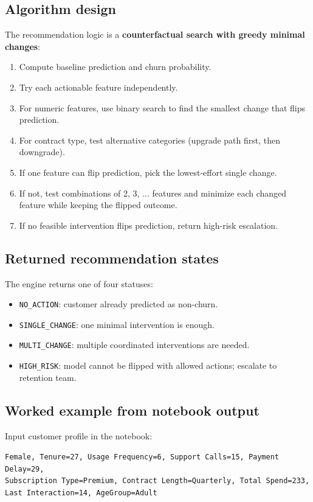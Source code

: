 \documentclass[11pt]{article}
\begin{document}
\subsection*{Algorithm design}
The recommendation logic is a \textbf{counterfactual search with greedy minimal changes}:
\begin{enumerate}
    \item Compute baseline prediction and churn probability.
    \item Try each actionable feature independently.
    \item For numeric features, use binary search to find the smallest change that flips prediction.
    \item For contract type, test alternative categories (upgrade path first, then downgrade).
    \item If one feature can flip prediction, pick the lowest-effort single change.
    \item If not, test combinations of 2, 3, ... features and minimize each changed feature while keeping the flipped outcome.
    \item If no feasible intervention flips prediction, return high-risk escalation.
\end{enumerate}

\subsection*{Returned recommendation states}
The engine returns one of four statuses:
\begin{itemize}
    \item \texttt{NO\_ACTION}: customer already predicted as non-churn.
    \item \texttt{SINGLE\_CHANGE}: one minimal intervention is enough.
    \item \texttt{MULTI\_CHANGE}: multiple coordinated interventions are needed.
    \item \texttt{HIGH\_RISK}: model cannot be flipped with allowed actions; escalate to retention team.
\end{itemize}

\subsection*{Worked example from notebook output}
Input customer profile in the notebook:
\begin{center}
\texttt{Female, Tenure=27, Usage Frequency=6, Support Calls=15, Payment Delay=29,}\\
\texttt{Subscription Type=Premium, Contract Length=Quarterly, Total Spend=233,}\\
\texttt{Last Interaction=14, AgeGroup=Adult}
\end{center}
\end{document}
